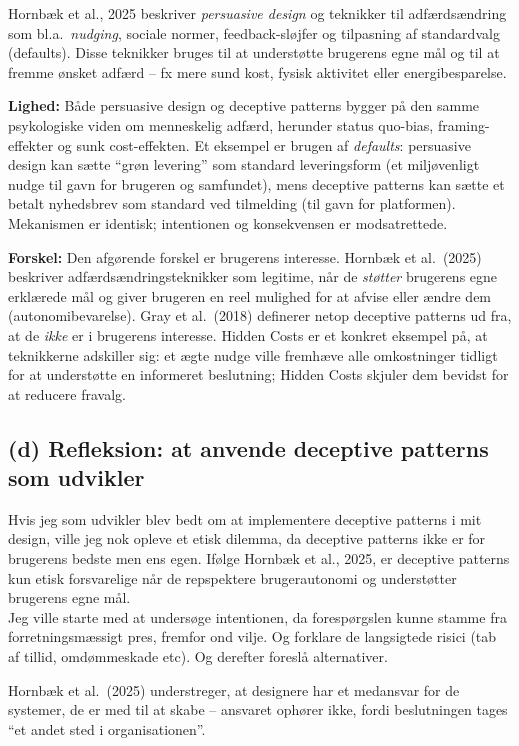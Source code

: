\documentclass[12pt,a4paper]{article}
\begin{document}
Hornbæk et al., 2025 beskriver \emph{persuasive design} og teknikker til
adfærdsændring som bl.a.\ \emph{nudging}, sociale normer, feedback-sløjfer og tilpasning af
standardvalg (defaults). Disse teknikker bruges til at understøtte brugerens egne mål og
til at fremme ønsket adfærd -- fx mere sund kost, fysisk aktivitet eller energibesparelse.

\textbf{Lighed:} Både persuasive design og deceptive patterns bygger på den samme
psykologiske viden om menneskelig adfærd, herunder status quo-bias, framing-effekter og
sunk cost-effekten. Et eksempel er brugen af \emph{defaults}: persuasive design kan sætte
``grøn levering'' som standard leveringsform (et miljøvenligt nudge til gavn for brugeren og
samfundet), mens deceptive patterns kan sætte et betalt nyhedsbrev som standard ved tilmelding
(til gavn for platformen). Mekanismen er identisk; intentionen og konsekvensen er modsatrettede.

\textbf{Forskel:} Den afgørende forskel er brugerens interesse. Hornbæk et al.\ (2025)
beskriver adfærdsændringsteknikker som legitime, når de \emph{støtter} brugerens egne erklærede
mål og giver brugeren en reel mulighed for at afvise eller ændre dem (autonomibevarelse).
Gray et al.\ (2018) definerer netop deceptive patterns ud fra, at de \emph{ikke} er i
brugerens interesse. Hidden Costs er et konkret eksempel på, at teknikkerne adskiller
sig: et ægte nudge ville fremhæve alle omkostninger tidligt for at understøtte en informeret
beslutning; Hidden Costs skjuler dem bevidst for at reducere fravalg.

\subsection*{(d) Refleksion: at anvende deceptive patterns som udvikler}

Hvis jeg som udvikler blev bedt om at implementere deceptive patterns i mit design, ville jeg nok opleve et etisk dilemma, da deceptive patterns ikke er for brugerens bedste men ens egen. Ifølge Hornbæk et al., 2025, er deceptive patterns kun etisk forsvarelige når de repspektere brugerautonomi og understøtter brugerens egne mål.\\
Jeg ville starte med at undersøge intentionen, da forespørgslen kunne stamme fra forretningsmæssigt pres, fremfor ond vilje. Og forklare de langsigtede risici (tab af tillid, omdømmeskade etc). Og derefter foreslå alternativer. 

Hornbæk et al.\ (2025) understreger, at designere har et medansvar for de systemer, de er med til at skabe -- ansvaret ophører ikke, fordi beslutningen tages ``et andet sted i organisationen''.
        
\end{document}
